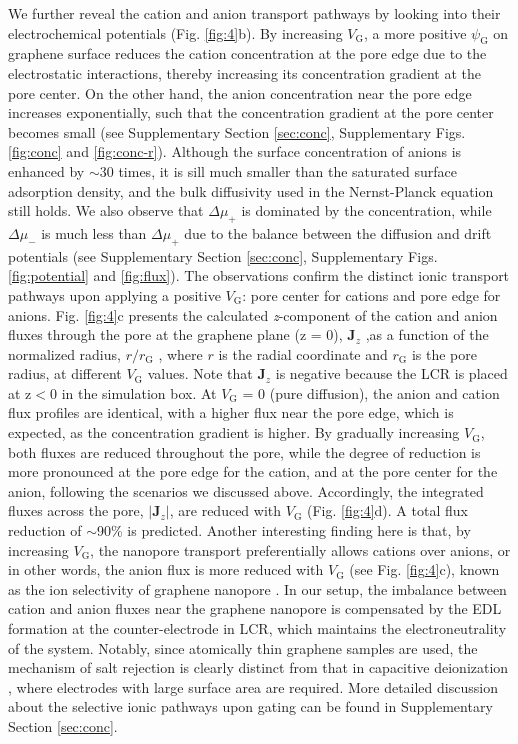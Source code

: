 \documentclass[journal=langd5,email=true, hyperref=true, keywords=false]{achemso}
\begin{document}
We further reveal the cation and anion transport pathways by looking
into their electrochemical potentials (Fig. \ref{fig:4}b). By
increasing $V_{\mathrm{G}}$, a more positive $\psi_{\mathrm{G}}$ on
graphene surface reduces the cation concentration at the pore edge due
to the electrostatic interactions, thereby increasing its
concentration gradient at the pore center. On the other hand, the
anion concentration near the pore edge increases exponentially, such
that the concentration gradient at the pore center becomes small (see
{ Supplementary Section \ref{sec:conc}, Supplementary
Figs. \ref{fig:conc} and \ref{fig:conc-r}}).
{
Although the surface
concentration of anions is enhanced by $\sim{}$30 times, it is sill
much smaller than the saturated surface adsorption density, and the
bulk diffusivity used in the Nernst-Planck equation still holds.  We
also observe that $\Delta \mu_{+}$ is dominated by the concentration,
while $\Delta \mu_{-}$ is much less than $\Delta \mu_{+}$ due to the
balance between the diffusion and drift potentials (see Supplementary
Section \ref{sec:conc}, Supplementary Figs.  \ref{fig:potential}
and \ref{fig:flux})}. 
The observations confirm the distinct ionic
transport pathways upon applying a positive $V_{\mathrm{G}}$: pore
center for cations and pore edge for anions. Fig. \ref{fig:4}c
presents the calculated \textit{z}-component of the cation and anion
fluxes through the pore at the graphene plane (z = 0),
$\boldsymbol{J}_{z}$ ,as a function of the normalized radius,
$r/r_{\mathrm{G}}$ , where $r$ is the radial coordinate and
$r_{\mathrm{G}}$ is the pore radius, at different $V_{\mathrm{G}}$
values. Note that $\boldsymbol{J}_{z}$ is negative because the LCR is
placed at z$<$0 in the simulation box. At $V_{\mathrm{G}}$ = 0 (pure
diffusion), the anion and cation flux profiles are identical, with a
higher flux near the pore edge, which is expected, as the
concentration gradient is higher. By gradually increasing
$V_{\mathrm{G}}$, both fluxes are reduced throughout the pore, while
the degree of reduction is more pronounced at the pore edge for the
cation, and at the pore center for the anion, following the scenarios
we discussed above. Accordingly, the integrated fluxes across the
pore, $|\boldsymbol{J}_{z}|$, are reduced with $V_{\mathrm{G}}$
(Fig. \ref{fig:4}d). A total flux reduction of $\sim$90\% is
predicted. Another interesting finding here is that, by increasing
$V_{\mathrm{G}}$, the nanopore transport preferentially allows cations
over anions, or in other words, the anion flux is more reduced with
$V_{\mathrm{G}}$ (see Fig. \ref{fig:4}c), known as the ion
selectivity of graphene nanopore \cite{Rollings_2016}. In our setup,
the imbalance between cation and anion fluxes near the graphene
nanopore is compensated by the EDL formation at the counter-electrode
in LCR, which maintains the electroneutrality of the system. Notably,
since atomically thin graphene samples are used, the mechanism of salt
rejection is clearly distinct from that in capacitive deionization
\cite{Biesheuvel_2010}, where electrodes with large surface area are
required. 
{
More detailed discussion about the selective ionic pathways
upon gating can be found in Supplementary Section \ref{sec:conc}.}
\end{document}
